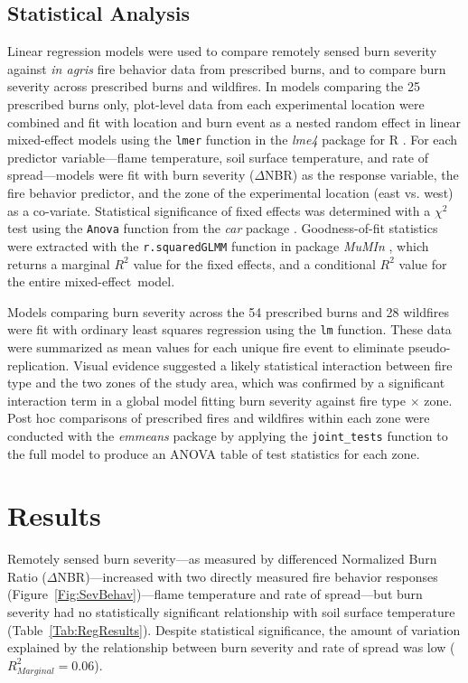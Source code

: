 \documentclass[fire,article,accept,oneauthor,pdftex]{Definitions/mdpi}
\begin{document}
\subsection{Statistical Analysis} 

Linear regression models were used to compare remotely sensed burn severity against \emph{in agris} fire behavior data from prescribed burns, and to compare burn severity across prescribed burns and wildfires. 
In models comparing the 25 prescribed burns only, plot-level data from each experimental location were combined and fit with location and burn event as a nested random effect in linear mixed-effect models using  the \texttt{lmer} function in the \emph{lme4} package for \textsf{R} \cite{bates2015}. 
For each predictor variable---flame temperature, soil surface temperature, and rate of spread---models were fit with burn severity ($\Delta$NBR) as the response variable, the fire behavior predictor, and the zone of the experimental location (east vs. west) as a co-variate.
Statistical significance of fixed effects was determined with a $\chi^{2}$ test using the \texttt{Anova} function from the \emph{car} package \cite{fox2019a}. 
Goodness-of-fit statistics were extracted with the \texttt{r.squaredGLMM} function in package \emph{MuMIn} \cite{barton2026}, which returns a marginal $R^2$ value for the fixed effects, and a conditional $R^2$ value for the entire mixed-effect~model. 

Models comparing burn severity across the 54 prescribed burns and 28 wildfires were fit with ordinary least squares regression using the \texttt{lm} function. 
These data were summarized as mean values for each unique fire event to eliminate pseudo-replication. 
Visual evidence suggested a likely statistical interaction between fire type and the two zones of the study area, which was confirmed by a significant interaction term in a global model fitting burn severity against fire type $\times$ zone.
Post hoc comparisons of prescribed fires and wildfires within each zone were conducted with the \emph{emmeans} package \cite{lenth2018} by applying the \texttt{joint\_tests} function to the full model to produce an ANOVA table of test statistics for each zone. 

\section{Results} 

Remotely sensed burn severity---as measured by differenced Normalized Burn Ratio ($\Delta$NBR)---increased with two directly measured fire behavior responses (Figure~\ref{Fig:SevBehav})---flame temperature and rate of spread---but burn severity had no statistically significant relationship with soil surface temperature (Table~\ref{Tab:RegResults}). 
Despite statistical significance, the amount of variation explained by the relationship between burn severity and rate of spread was low ($R^{2}_{Marginal}=0.06$).
\vspace{-6pt}
\end{document}
